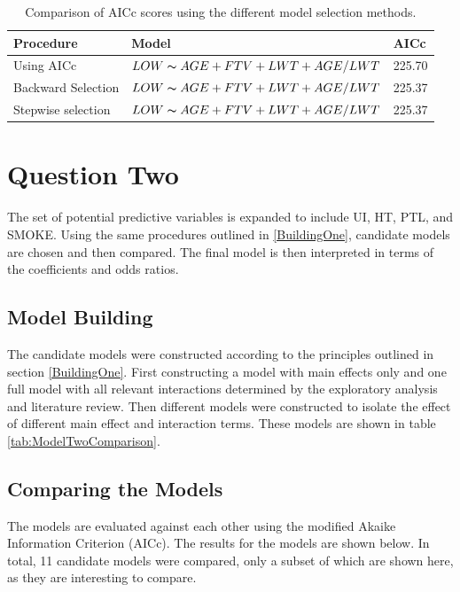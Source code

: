 \renewcommand\arraystretch{1.2}
\begin{table}[hbt!]
    \centering
    \begin{tabular}[t]{lll}
        \toprule
        Procedure & Model & AICc \\
        \midrule
        Using AICc & \small{$LOW\thicksim AGE+FTV+LWT+AGE/LWT$} & 225.70 \\
        Backward Selection & \small{$LOW\thicksim AGE+FTV+LWT+AGE/LWT$} & 225.37 \\
        Stepwise selection & \small{$LOW\thicksim AGE+FTV+LWT+AGE/LWT$} & 225.37 \\
        \bottomrule
    \end{tabular}
    \caption{Comparison of AICc scores using the different model selection methods.}
    \label{tab:comparison-4variables}
\end{table}%

\section{Question Two}
The set of potential predictive variables is expanded to include UI, HT, PTL, and SMOKE. Using the same procedures outlined in \ref{BuildingOne}, candidate models are chosen and then compared. The final model is then interpreted in terms of the coefficients and odds ratios.

\subsection{Model Building} \label{BuildingTwo}
The candidate models were constructed according to the principles outlined in section \ref{BuildingOne}. First constructing a model with main effects only and one full model with all relevant interactions determined by the exploratory analysis and literature review. Then different models were constructed to isolate the effect of different main effect and interaction terms. These models are shown in table \ref{tab:ModelTwoComparison}.

\subsection{Comparing the Models}
The models are evaluated against each other using the modified Akaike Information Criterion (AICc). The results for the models are shown below. In total, 11 candidate models were compared, only a subset of which are shown here, as they are interesting to compare. 

